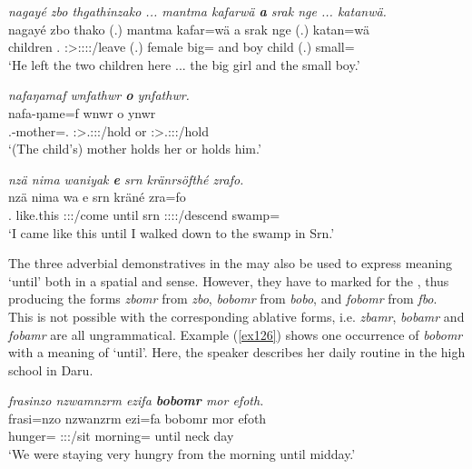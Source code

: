 \begin{exe}
	\ex \emph{nagayé zbo thgathinzako ... mantma kafarwä \textbf{a} srak nge ... katanwä.}\\
	\gll nagayé zbo thako (.) mantma kafar=wä a srak nge (.) katan=wä\\
	children {\Prox}.{\All} \Sg:\Sbj>\Stdu:\Obj:\Pst:\Pfv:\Andat/leave (.) female big={\Emph} and boy child (.) small={\Emph}\\
	\trans `He left the two children here ... the big girl and the small boy.' 
	\label{ex123}
\end{exe}
\begin{exe}
	\ex \emph{nafaŋamaf wnfathwr \textbf{o} ynfathwr.}\\
	\gll nafa-ŋame=f wnwr o ynwr\\
	\Third.{\Poss}-mother=\Erg.{\Sg} \Stsg:\Sbj>\Tsg.\F:\Obj:\Nonpast:\Venit/hold or \Stsg:\Sbj>\Tsg.\Masc:\Obj:\Nonpast:\Venit/hold\\
	\trans `(The child's) mother holds her or holds him.' 
	\label{ex124}
\end{exe}
\begin{exe}
	\ex \emph{nzä nima waniyak \textbf{e} srn kränrsöfthé zrafo.}\\
	\gll nzä nima wa e srn kräné zra=fo\\
	\Fsg.{\Abs} {like.this} \Fsg:\Sbj:\Nonpast:\Ipfv/come until srn \Fsg:\Sbj:\Irr:\Pfv:\Venit/descend swamp={\All}\\
	\trans `I came like this until I walked down to the swamp in Srn.'
	\label{ex125}
\end{exe}

The three adverbial demonstratives in the   may also be used to express meaning `until' both in a spatial and  sense. However, they have to marked for the  , thus producing the forms \emph{zbomr} from \emph{zbo}, \emph{bobomr} from \emph{bobo}, and \emph{fobomr} from \emph{fbo}. This is not possible with the corresponding ablative forms, i.e. \emph{zbamr}, \emph{bobamr} and \emph{fobamr} are all ungrammatical. Example (\ref{ex126}) shows one occurrence of \emph{bobomr} with a  meaning of `until'. Here, the speaker describes her daily routine in the high school in Daru.

\begin{exe}
	\ex \emph{frasinzo nzwamnzrm ezifa \textbf{bobomr} mor efoth.}\\
	\gll frasi=nzo nzwanzrm ezi=fa bobomr mor efoth\\
	hunger={\Only} \Fpl:\Sbj:\Pst:\Dur/sit morning={\Abl} until neck day\\
	\trans `We were staying very hungry from the morning until midday.'\\ 
	\label{ex126}
\end{exe}

